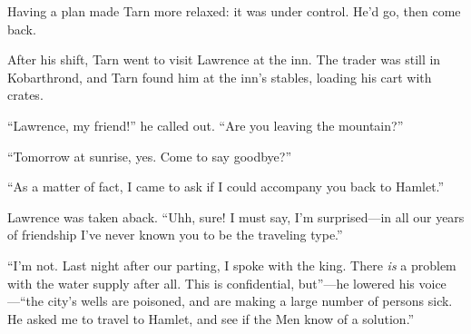 Having a plan made Tarn more relaxed: it was under control.  He'd go, then come back.

After his shift, Tarn went to visit Lawrence at the inn.  The trader was still in Kobarthrond, and Tarn found him at the inn's stables, loading his cart with crates.

``Lawrence, my friend!'' he called out.  ``Are you leaving the mountain?''

``Tomorrow at sunrise, yes.  Come to say goodbye?''

``As a matter of fact, I came to ask if I could accompany you back to Hamlet.''

Lawrence was taken aback.  ``Uhh, sure!  I must say, I'm surprised---in all our years of friendship I've never known you to be the traveling type.''

``I'm not.  Last night after our parting, I spoke with the king.  There \emph{is} a problem with the water supply after all.  This is confidential, but''---he lowered his voice---``the city's wells are poisoned, and are making a large number of persons sick.  He asked me to travel to Hamlet, and see if the Men know of a solution.''